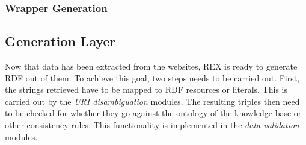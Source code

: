 

\subsubsection{Wrapper Generation} %
\label{alfred}



\subsection{Generation Layer}
Now that data has been extracted from the websites, REX is ready to generate RDF out of them. 
To achieve this goal, two steps needs to be carried out. 
First, the strings retrieved have to be mapped to RDF resources or literals. 
This is carried out by the \emph{URI disambiguation} modules. 
The resulting triples then need to be checked for whether they go against the ontology of the knowledge base or other consistency rules. 
This functionality is implemented in the \emph{data validation} modules. 

